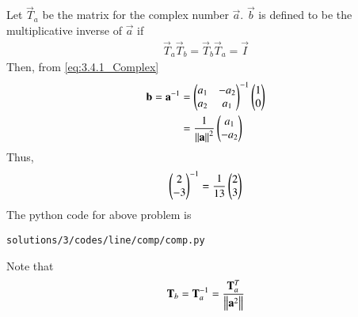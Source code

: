 Let $\vec{T}_a$ be the matrix for the complex number $\vec{a}$.  $\vec{b}$ is defined to be the multiplicative inverse of $\vec{a}$ if 
\begin{align}
\label{eq:3.4.1_Complex_inv}
\vec{T}_a \vec{T}_b = \vec{T}_b \vec{T}_a = \vec{I}
\end{align}
Then, from \eqref{eq:3.4.1_Complex}
%
\begin{align}
\mathbf{b}=\mathbf{a}^{-1} &= \begin{pmatrix}a_1&-a_2\\a_2&a_1\end{pmatrix}^{-1}\begin{pmatrix}1\\0\end{pmatrix}\\
&=\frac{1}{\left\lVert\mathbf{a}\right\rVert^2}\begin{pmatrix}a_1\\-a_2\end{pmatrix}
\label{eq:3.4.3_comp_inv}
\end{align}
Thus, 
\begin{align}
\begin{pmatrix}2\\-3\end{pmatrix}^{-1}= \frac{1}{13}\begin{pmatrix}2\\3\end{pmatrix}
\end{align}
The python code for above problem is
\begin{lstlisting}
solutions/3/codes/line/comp/comp.py
\end{lstlisting}
Note that 
\begin{align}
\mathbf{T}_b = \mathbf{T}^{-1}_a  = \frac{\mathbf{T}_a^T}{\left\lVert\mathbf{a}^2\right\rVert}
\end{align}
